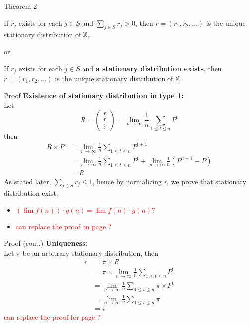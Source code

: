\documentclass[mathserif]{beamer}
\begin{document}
\begin{frame}{Theorem 2}
	\begin{theorem}[type 1]
	If $r_j$ exists for each $j \in S$ and $\sum_{j \in S} r_j > 0$,
	then $r = (r_1, r_2, \ldots)$ is the unique stationary distribution of $\mathbb{X}$.
	\end{theorem}
	or
	\begin{theorem}[type 2]
	If $r_j$ exists for each $j \in S$ and \textbf{a stationary distribution exists},
	then $r = (r_1, r_2, \ldots)$ is the unique stationary distribution of $\mathbb{X}$.
	\end{theorem}
\end{frame}

\begin{frame}[shrink]{Proof}
	\textbf{Existence of stationary distribution in type 1:} \\
	Let 
	\[
	R = 
	\begin{pmatrix}
		r \\
		r \\
		\vdots
	\end{pmatrix} 
	= \lim_{n\to\infty} \frac{1}{n} \sum_{1 \leq t \leq n} P^t
	\]
	then
	\begin{align*}
		R \times P &= \lim_{n\to\infty} \frac{1}{n} \sum_{1 \leq t \leq n} P^{t+1} \\
		&= \lim_{n\to\infty} \frac{1}{n} \sum_{1 \leq t \leq n} P^t + \lim_{n\to\infty} \frac{1}{n}(P^{n+1} - P) \\
		&= R
	\end{align*}
	As stated later, $\sum_{j \in S} r_j \leq 1$, hence by normalizing $r$, we prove that stationary distribution exist.
	\begin{itemize}
	\item \textcolor{red}{$(\lim f(n))\cdot g(n) = \lim f(n) \cdot g(n)$?}
	\item \textcolor{red}{can replace the proof on page \pageref{existence}?}
	\end{itemize}
\end{frame}

\begin{frame}{Proof (cont.)}
	\textbf{Uniqueness:} \\
	Let $\pi$ be an arbitrary stationary distribution, then
	\begin{align*}
	r &= \pi \times R \\
	&= \pi \times \lim_{n\to\infty} \frac{1}{n} \sum_{1 \leq t \leq n} P^t \\
	&= \lim_{n\to\infty} \frac{1}{n} \sum_{1 \leq t \leq n} \pi \times P^t \\
	&= \lim_{n\to\infty} \frac{1}{n} \sum_{1 \leq t \leq n} \pi \\
	&= \pi
	\end{align*}
	\textcolor{red}{can replace the proof for page \pageref{uniqueness}?}
\end{frame}
\end{document}
